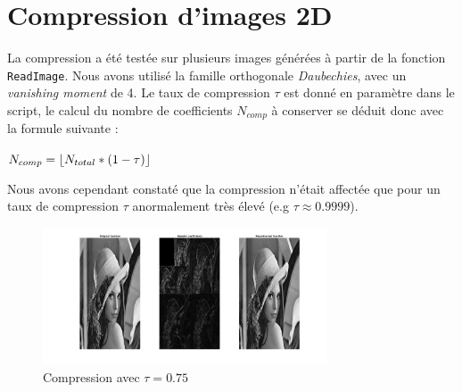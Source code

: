 \documentclass[a4paper,12pt, openany, twoside]{article}
\DeclarePairedDelimiter\floor{\lfloor}{\rfloor}
\theoremstyle{break}
\begin{document}



\pagestyle{fancy}


\tableofcontents

\clearpage

\listoffigures

\clearpage

\section{Compression d'images 2D}
La compression a été testée sur plusieurs images générées à partir de la fonction \texttt{ReadImage}. Nous avons utilisé la famille orthogonale \textit{Daubechies}, avec un \textit{vanishing moment} de 4. Le taux de compression $\tau$ est donné en paramètre dans le script, le calcul du nombre de coefficients $N_{comp}$ à conserver se déduit donc avec la formule suivante :

  $N_{comp} = \floor* {N_{total} * (1 - \tau)}$

Nous avons cependant constaté que la compression n'était affectée que pour un taux de compression $\tau$ anormalement très élevé (e.g $\tau \approx 0.9999$).


\begin{figure}[H]
  \centering
  \includegraphics[width=0.75\textwidth]{comp_lenna}\vfill
  \caption{Compression avec $\tau=0.75$}
\end{figure}
\end{document}
